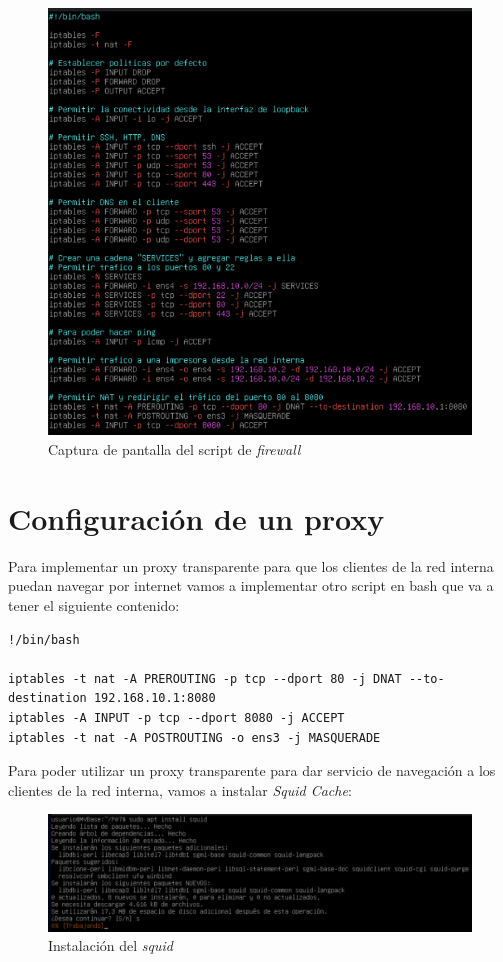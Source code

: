 \documentclass{report}
\begin{document}
  \begin{figure}[H]
    \centering
    \includegraphics[scale=0.65]{img/firewall.png}
    \caption{Captura de pantalla del script de \emph{firewall}}
    \label{fig:script firewall}
  \end{figure}

  \chapter{Configuración de un proxy}
  Para implementar un proxy transparente para que los clientes de la red interna
  puedan navegar por internet vamos a implementar otro script en bash que va a
  tener el siguiente contenido:

  \begin{verbatim}
!/bin/bash

iptables -t nat -A PREROUTING -p tcp --dport 80 -j DNAT --to-destination 192.168.10.1:8080
iptables -A INPUT -p tcp --dport 8080 -j ACCEPT
iptables -t nat -A POSTROUTING -o ens3 -j MASQUERADE
  \end{verbatim}

  Para poder utilizar un proxy transparente para dar servicio de navegación a los
  clientes de la red interna, vamos a instalar \emph{Squid Cache}:

  \begin{figure}[H]
    \centering
    \includegraphics[scale=0.5]{img/squid.png}
    \caption{Instalación del \emph{squid}}
    \label{fig:squid}
  \end{figure}
\end{document}
